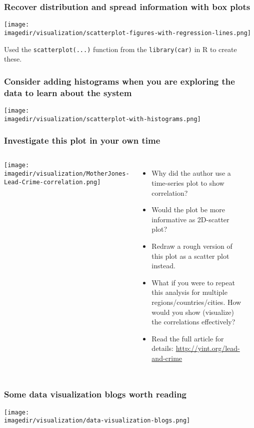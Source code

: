 \begin{frame}\frametitle{Recover distribution and spread information with box plots}
	\texttt{[image: \\imagedir/visualization/scatterplot-figures-with-regression-lines.png]}
	
	Used the \texttt{scatterplot(...)} function from the \texttt{library(car)} in R to create these.
\end{frame}

\begin{frame}\frametitle{Consider adding histograms when you are exploring the data to learn about the system}
	\begin{center}
		\texttt{[image: \\imagedir/visualization/scatterplot-with-histograms.png]}
	\end{center}
\end{frame}

\begin{frame}\frametitle{Investigate this plot in your own time}
	\begin{columns}[T]
			\vspace{-12pt}
			\begin{center}
				\texttt{[image: \\imagedir/visualization/MotherJones-Lead-Crime-correlation.png]}
			\end{center}
			\begin{itemize}
				\item	Why did the author use a time-series plot to show correlation?
				\item	Would the plot be more informative as 2D-scatter plot?
				\item	Redraw a rough version of this plot as a scatter plot instead.
				\item	What if you were to repeat this analysis for multiple regions/countries/cities. How would you show (visualize) the correlations effectively?
				\item	Read the full article for details: \href{http://www.motherjones.com/environment/2013/01/lead-crime-link-gasoline}{http://yint.org/lead-and-crime}
			\end{itemize}
			\hrule
			\vspace{4pt}
	\end{columns}
\end{frame}

\begin{frame}\frametitle{Some data visualization blogs worth reading}
	\begin{center}
		\texttt{[image: \\imagedir/visualization/data-visualization-blogs.png]}
	\end{center}
\end{frame}

